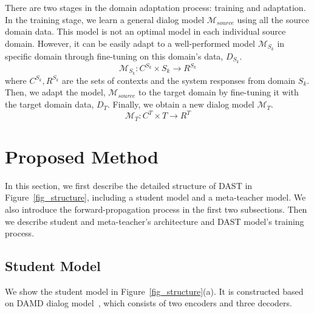 \documentclass[letterpaper]{article} %
\begin{document}
There are two stages in the domain adaptation process: training and adaptation.
In the training stage, we learn a general dialog model $\mathcal{M}_{source}$ using all the source domain data. This model is not an optimal model in each individual source domain. However, it can be easily adapt to a well-performed model $\mathcal{M}_{S_k}$ in specific domain through fine-tuning on this domain's data, $D_{S_k}$.
$$\mathcal{M}_{S_k}:C^{S_k}\times S_k\rightarrow R^{S_k}$$
where $C^{S_k}, R^{S_k}$ are the sets of contexts and the system responses from domain $S_k$.
Then, we adapt the model, $\mathcal{M}_{source}$ to the target domain by fine-tuning it with the target domain data, $D_T$. Finally, we obtain a new dialog model $\mathcal{M}_{T}$. %
    $$\mathcal{M}_{T}:C^T\times T\rightarrow R^T$$




\section*{Proposed Method}
In this section, we first describe the detailed structure of DAST in Figure~\ref{fig_structure}, including a student model and a meta-teacher model. We also introduce the forward-propagation process in the first two subsections.
%
Then we describe student and meta-teacher's architecture and DAST model's training process.



\subsection*{Student Model}
We show the student model in Figure~\ref{fig_structure}(a). It is constructed based on DAMD dialog model~\citep{zhang2019task}, which consists of two encoders and three decoders.
\end{document}
